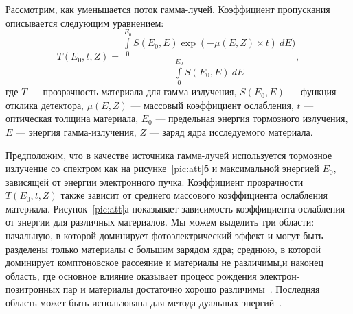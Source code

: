 Рассмотрим, как уменьшается поток гамма-лучей. Коэффициент пропускания описывается следующим уравнением:
\begin{equation}
\label{eq:trans}
T(E_0, t, Z) = \frac{\int \limits_0^{E_0} S(E_0, E) \exp(-\mu(E,Z)\times t)~dE)}{\int \limits_0^{E_0} S(E_0, E)~dE},
\end{equation}
где $T$ --- прозрачность материала для гамма-излучения, $S(E_0, E)$ --- функция отклика детектора, $\mu(E,Z)$ --- массовый коэффициент ослабления, $t$ ---  оптическая толщина материала, $E_0$ --- предельная энергия тормозного излучения, $E$ --- энергия гамма-излучения, $Z$ --- заряд ядра исследуемого материала.

Предположим, что в качестве источника гамма-лучей используется тормозное излучение со спектром как на рисунке~\ref{pic:att}б и максимальной энергией $E_0$, зависящей от энергии электронного пучка. Коэффициент прозрачности  $T(E_0, t, Z)$ также зависит от среднего массового коэффициента ослабления материала. Рисунок~\ref{pic:att}а показывает зависимость коэффициента ослабления от энергии для различных материалов. Мы можем выделить три области: начальную, в которой доминирует фотоэлектрический эффект и могут быть разделены только материалы с большим зарядом ядра; среднюю, в которой доминирует комптоновское рассеяние и материалы не различимы,и наконец область, где основное влияние оказывает процесс рождения электрон-позитронных пар и материалы достаточно хорошо различимы~\cite{geheitler1984quantum, spirin, Geant2016}. Последняя область может быть использована для метода дуальных энергий~\cite{spirin}.

